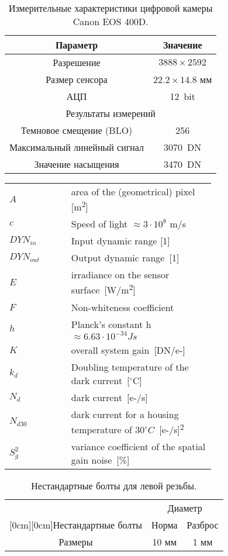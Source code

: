 \documentclass[a4paper,12pt]{report} %
\begin{document}
\begin{table}[H]
\caption{\label{tab:canonsummary}Измерительные характеристики цифровой камеры Canon EOS 400D.}
\begin{center}
\begin{tabular}{|c|c|}
\hline
Параметр & Значение \\
\hline
Разрешение & $3888 \times 2592$ \\
Размер сенсора & $22.2 \times 14.8$ мм \\
АЦП & 12~bit\\
\hline
\multicolumn{2}{|c|}{Результаты измерений} \\
\hline
Темновое смещение (BLO) & 256 \\
Максимальный линейный сигнал & 3070~DN \\
Значение насыщения & 3470~DN \\
\hline
\end{tabular}
\end{center}
\end{table}
\begin{longtable}[h]{lp{0.7\linewidth}}
$A$ & area of the (geometrical) pixel [m\textsuperscript2] \\
$c$ & Speed of light $\approx 3 \cdot 10^8$ m/s \\
$DYN_{in}$ & Input dynamic range [1] \\
$DYN_{out}$ & Output dynamic range~[1] \\
$E$ & irradiance on the sensor surface~[W/m\textsuperscript2] \\
$F$ & Non-whiteness coefficient \\ 
$h$ & Planck's constant h $\approx6.63 \cdot 10^{-34} Js$ \\
$K$ & overall system gain~[DN/e-] \\
$k_d$ & Doubling temperature of the dark current~[$^\circ$C] \\
$N_d$ & dark current~[e-/s] \\
$N_{d30}$ & dark current for a housing temperature of $30^\circ C$~[e-/s]\textsuperscript2 \\
$S_g^2$ & variance coefficient of the spatial gain noise~[\%] \\
\end{longtable}
\begin{table}[H]
\caption{\label{tab:bolts} Нестандартные болты для левой резьбы.}
\begin{center}
\begin{tabular}{|c|c|c|}
\hline
& \multicolumn{2}{c|}{Диаметр} \\
\cline{2-3}
\raisebox{1.5ex}[0cm][0cm]{Нестандартные болты}
& Норма & Разброс \\
\hline
Размеры & 10 мм & 1 мм \\
\hline
\end{tabular}
\end{center}
\end{table}
\end{document}
